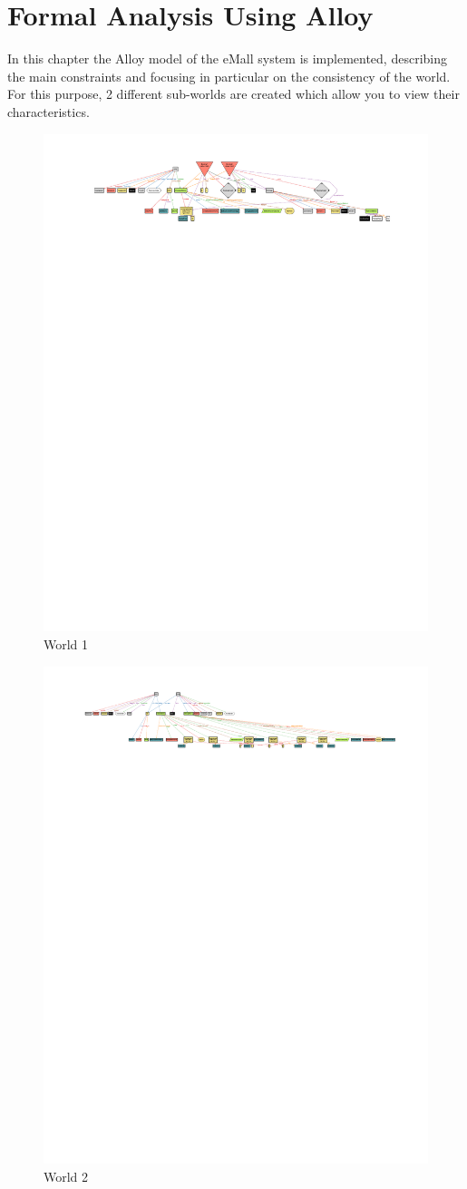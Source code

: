 \chapter{Formal Analysis Using Alloy}
In this chapter the Alloy model of the eMall system is implemented, describing the main constraints and focusing in particular on the consistency of the world.\\
For this purpose, 2 different sub-worlds are created which allow you to view their characteristics.

\clearpage
\begin{figure}[H]
\centering
\includegraphics[angle=90,origin=c, height=0.85\textwidth]{images/world1.pdf}
\caption{World 1}
\label{fig:world_1}
\end{figure}
\begin{figure}[H]
\centering
\includegraphics[angle=90,origin=c, height=0.85\textwidth]{images/world2.pdf}
\caption{World 2}
\label{fig:world_2}
\end{figure}

